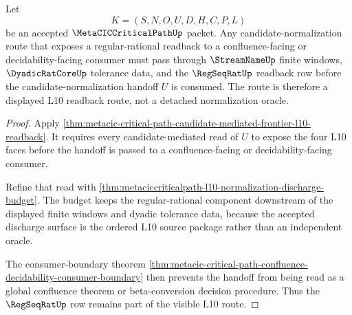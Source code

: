 \begin{theorem}
\label{thm:metaciccriticalpath-regseqrat-candidate-normalization-route}
Let
$$
K=(S,N,O,U,D,H,C,P,L)
$$
be an accepted $\MetaCICCriticalPathUp$ packet. Any candidate-normalization route that exposes a regular-rational readback to a confluence-facing or decidability-facing consumer must pass through $\StreamNameUp$ finite windows, $\DyadicRatCoreUp$ tolerance data, and the $\RegSeqRatUp$ readback row before the candidate-normalization handoff $U$ is consumed. The route is therefore a displayed L10 readback route, not a detached normalization oracle.
\end{theorem}
\begin{proof}
Apply \autoref{thm:metacic-critical-path-candidate-mediated-frontier-l10-readback}. It requires every candidate-mediated read of $U$ to expose the four L10 faces before the handoff is passed to a confluence-facing or decidability-facing consumer.

Refine that read with \autoref{thm:metaciccriticalpath-l10-normalization-discharge-budget}. The budget keeps the regular-rational component downstream of the displayed finite windows and dyadic tolerance data, because the accepted discharge surface is the ordered L10 source package rather than an independent oracle.

The consumer-boundary theorem \autoref{thm:metacic-critical-path-confluence-decidability-consumer-boundary} then prevents the handoff from being read as a global confluence theorem or beta-conversion decision procedure. Thus the $\RegSeqRatUp$ row remains part of the visible L10 route.
\end{proof}


